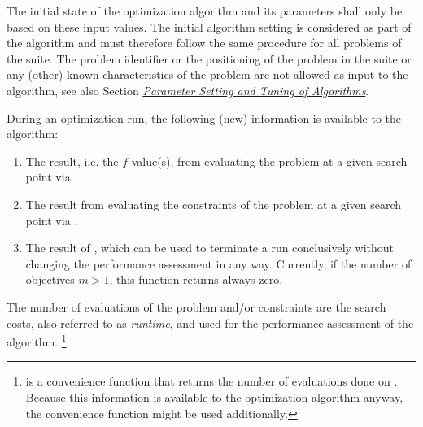 \documentclass[letterpaper,12pt,english]{article}
\begin{document}
The initial state of the optimization algorithm and its parameters shall only be based on
these input values. The initial algorithm setting is considered as part of
the algorithm and must therefore follow the same procedure for all problems of the
suite. The problem identifier or the positioning of the problem in the suite or
any (other) known characteristics of the problem are not
allowed as input to the algorithm, see also Section
{\hyperref[index:sec\string-tuning]{\emph{Parameter Setting and Tuning of Algorithms}}}.

During an optimization run, the following (new) information is available to
the algorithm:
\begin{enumerate}
\item {} 
The result, i.e. the \(f\)-value(s), from evaluating the problem
at a given search point
via \href{http://numbbo.github.io/coco-doc/C/coco\_8h.html\#aabbc02b57084ab069c37e1c27426b95c}{}.

\item {} 
The result from evaluating the constraints of the problem at a
given search point via \href{http://numbbo.github.io/coco-doc/C/coco\_8h.html\#ab5cce904e394349ec1be1bcdc35967fa}{}.

\item {} 
The result of \href{http://numbbo.github.io/coco-doc/C/coco\_8h.html\#a1164d85fd641ca48046b943344ae9069}{}, which can be used
to terminate a run conclusively without changing the performance assessment
in any way. Currently, if the number of objectives \(m > 1\), this
function returns always zero.

\end{enumerate}

The number of evaluations of the problem and/or constraints are the search
costs, also referred to as \emph{runtime}, and used for the performance
assessment of the algorithm. \footnote[3]{
\href{http://numbbo.github.io/coco-doc/C/coco\_8h.html\#a6ad88cdba2ffd15847346d594974067f}{} is a
convenience function that returns the number of evaluations done on .
Because this information is available to the optimization algorithm anyway,
the convenience function might be used additionally.
}
\end{document}

